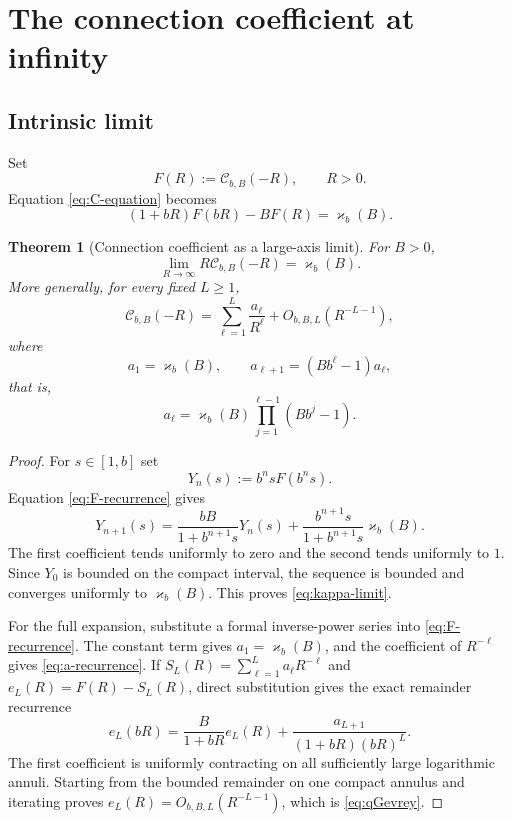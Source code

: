 \documentclass[11pt]{article}
\newtheorem{theorem}{Theorem}[section]
\theoremstyle{definition}
\newcommand{\Cker}{\mathscr{C}}
\newcommand{\kk}{\varkappa}
\begin{document}
\section{The connection coefficient at infinity}

\subsection{Intrinsic limit}

Set
\[
 F(R):=\Cker_{b,B}(-R),\qquad R>0.
\]
Equation \eqref{eq:C-equation} becomes
\begin{equation}\label{eq:F-recurrence}
 (1+bR)F(bR)-BF(R)=\kk_b(B).
\end{equation}

\begin{theorem}[Connection coefficient as a large-axis limit]\label{thm:kappa-limit}
For $B>0$,
\begin{equation}\label{eq:kappa-limit}
 \boxed{\displaystyle
 \lim_{R\to\infty}R\Cker_{b,B}(-R)=\kk_b(B).}
\end{equation}
More generally, for every fixed $L\ge1$,
\begin{equation}\label{eq:qGevrey}
 \Cker_{b,B}(-R)
 =\sum_{\ell=1}^{L}\frac{a_\ell}{R^\ell}
 +O_{b,B,L}(R^{-L-1}),
\end{equation}
where
\begin{equation}\label{eq:a-recurrence}
 a_1=\kk_b(B),\qquad
 a_{\ell+1}=(Bb^\ell-1)a_\ell,
\end{equation}
that is,
\begin{equation}\label{eq:a-product}
 a_\ell=\kk_b(B)\prod_{j=1}^{\ell-1}(Bb^j-1).
\end{equation}
\end{theorem}

\begin{proof}
For $s\in[1,b]$ set
\[
 Y_n(s):=b^nsF(b^ns).
\]
Equation \eqref{eq:F-recurrence} gives
\[
 Y_{n+1}(s)
 =\frac{bB}{1+b^{n+1}s}Y_n(s)
 +\frac{b^{n+1}s}{1+b^{n+1}s}\kk_b(B).
\]
The first coefficient tends uniformly to zero and the second tends uniformly to $1$.  Since $Y_0$ is bounded on the compact interval, the sequence is bounded and converges uniformly to $\kk_b(B)$.  This proves \eqref{eq:kappa-limit}.

For the full expansion, substitute a formal inverse-power series into \eqref{eq:F-recurrence}.
The constant term gives $a_1=\kk_b(B)$, and the coefficient of $R^{-\ell}$ gives
\eqref{eq:a-recurrence}.  If
$S_L(R)=\sum_{\ell=1}^{L}a_\ell R^{-\ell}$ and
$e_L(R)=F(R)-S_L(R)$, direct substitution gives the exact remainder recurrence
\[
 e_L(bR)=\frac{B}{1+bR}e_L(R)
 +\frac{a_{L+1}}{(1+bR)(bR)^L}.
\]
The first coefficient is uniformly contracting on all sufficiently large logarithmic
annuli.  Starting from the bounded remainder on one compact annulus and iterating proves
$e_L(R)=O_{b,B,L}(R^{-L-1})$, which is \eqref{eq:qGevrey}.
\end{proof}
\end{document}
